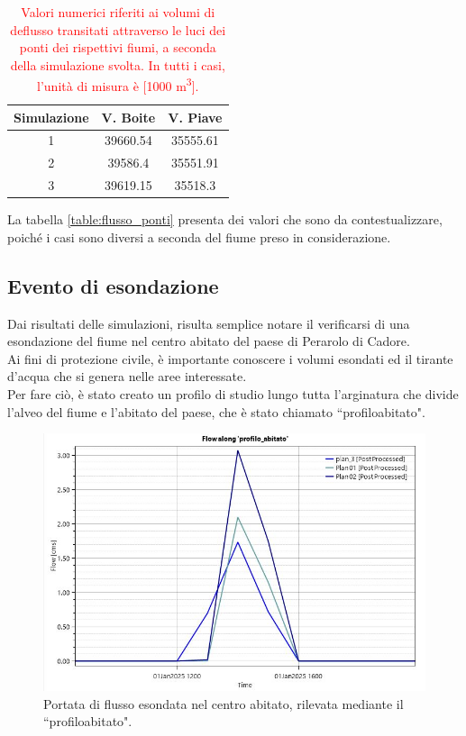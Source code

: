 
\begin{table}[hbt]\centering
    \caption{\textcolor{red}{Valori numerici riferiti ai volumi di deflusso transitati attraverso le luci dei ponti dei rispettivi fiumi, a seconda della simulazione svolta. In tutti i casi, l'unità di misura è [1000 \unit{m^3}].}}
    \begin{tabular}{ccc}
    \toprule
    Simulazione & V. Boite & V. Piave \\
    \midrule
    1 & 39660.54 & 35555.61 \\
    2 & 39586.4 & 35551.91 \\
    3 & 39619.15 & 35518.3  \\
    \bottomrule
    \end{tabular}
    \label{table:flusso_ponti}
    \end{table}

La tabella \eqref{table:flusso_ponti} presenta dei valori che sono da contestualizzare, poiché i casi sono diversi a seconda del fiume preso in considerazione.

\subsection{Evento di esondazione}
Dai risultati delle simulazioni, risulta semplice notare il verificarsi di una esondazione del fiume nel centro abitato del paese di Perarolo di Cadore.\\
Ai fini di protezione civile, è importante conoscere i volumi esondati ed il tirante d'acqua che si genera nelle aree interessate.\\
Per fare ciò, è stato creato un profilo di studio lungo tutta l'arginatura che divide l'alveo del fiume e l'abitato del paese, che è stato chiamato ``profilo\textunderscore abitato".

\begin{figure}[H] \centering
    \includegraphics[scale=0.5]{immagini/flow_centro_abitato.JPG}
    \caption{Portata di flusso esondata nel centro abitato, rilevata mediante il ``profilo\textunderscore abitato".}
    \label{figure:flow_centro_abitato}
\end{figure}

